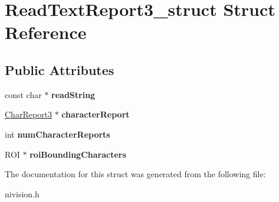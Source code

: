 \hypertarget{structReadTextReport3__struct}{
\section{ReadTextReport3\_\-struct Struct Reference}
\label{structReadTextReport3__struct}
}
\subsection*{Public Attributes}
\begin{DoxyCompactItemize}
\item 
\hypertarget{structReadTextReport3__struct_a7ecaf1245de7d09d7db19a84696741c1}{
const char $\ast$ {\bfseries readString}}
\label{structReadTextReport3__struct_a7ecaf1245de7d09d7db19a84696741c1}

\item 
\hypertarget{structReadTextReport3__struct_a3379588f572112f360e1248c305cb1d5}{
\hyperlink{structCharReport3__struct}{CharReport3} $\ast$ {\bfseries characterReport}}
\label{structReadTextReport3__struct_a3379588f572112f360e1248c305cb1d5}

\item 
\hypertarget{structReadTextReport3__struct_a47f025421ba3965ec47e436d6c05788a}{
int {\bfseries numCharacterReports}}
\label{structReadTextReport3__struct_a47f025421ba3965ec47e436d6c05788a}

\item 
\hypertarget{structReadTextReport3__struct_af18a67c1118183a326394bfa90d73864}{
ROI $\ast$ {\bfseries roiBoundingCharacters}}
\label{structReadTextReport3__struct_af18a67c1118183a326394bfa90d73864}

\end{DoxyCompactItemize}


The documentation for this struct was generated from the following file:\begin{DoxyCompactItemize}
\item 
nivision.h\end{DoxyCompactItemize}
